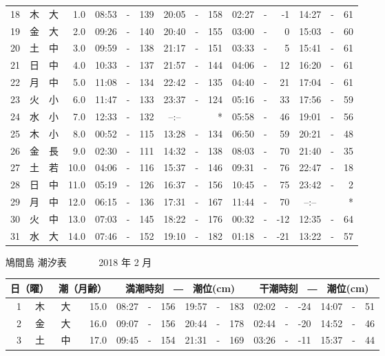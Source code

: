 \documentclass[12pt.a4j]{jsarticle}
\begin{document}
\begin{center}
\begin{table}[ht]
\begin{tabular}{|rc|cr|ccrccr|ccrccr|}
18 & 木 & 大 &  1.0 & 08:53 &-& 139 & 20:05 &-& 158 & 02:27 &-&  -1 & 14:27 &-&  61 \\
19 & 金 & 大 &  2.0 & 09:26 &-& 140 & 20:40 &-& 155 & 03:00 &-&   0 & 15:03 &-&  60 \\
20 & 土 & 中 &  3.0 & 09:59 &-& 138 & 21:17 &-& 151 & 03:33 &-&   5 & 15:41 &-&  61 \\
21 & 日 & 中 &  4.0 & 10:33 &-& 137 & 21:57 &-& 144 & 04:06 &-&  12 & 16:20 &-&  61 \\
22 & 月 & 中 &  5.0 & 11:08 &-& 134 & 22:42 &-& 135 & 04:40 &-&  21 & 17:04 &-&  61 \\
23 & 火 & 小 &  6.0 & 11:47 &-& 133 & 23:37 &-& 124 & 05:16 &-&  33 & 17:56 &-&  59 \\
24 & 水 & 小 &  7.0 & 12:33 &-& 132 & --:-- & &  *  & 05:58 &-&  46 & 19:01 &-&  56 \\
25 & 木 & 小 &  8.0 & 00:52 &-& 115 & 13:28 &-& 134 & 06:50 &-&  59 & 20:21 &-&  48 \\
26 & 金 & 長 &  9.0 & 02:30 &-& 111 & 14:32 &-& 138 & 08:03 &-&  70 & 21:40 &-&  35 \\
27 & 土 & 若 & 10.0 & 04:06 &-& 116 & 15:37 &-& 146 & 09:31 &-&  76 & 22:47 &-&  18 \\
28 & 日 & 中 & 11.0 & 05:19 &-& 126 & 16:37 &-& 156 & 10:45 &-&  75 & 23:42 &-&   2 \\
29 & 月 & 中 & 12.0 & 06:15 &-& 136 & 17:31 &-& 167 & 11:44 &-&  70 & --:-- & &  *  \\
30 & 火 & 中 & 13.0 & 07:03 &-& 145 & 18:22 &-& 176 & 00:32 &-& -12 & 12:35 &-&  64 \\
31 & 水 & 大 & 14.0 & 07:46 &-& 152 & 19:10 &-& 182 & 01:18 &-& -21 & 13:22 &-&  57 \\
\hline
\end{tabular}
\end{table}
\newpage
{\LARGE 鳩間島  潮汐表　　　}
{\large 2018 年  2 月}\\
\begin{table}[ht]
\begin{tabular}{|rc|cr|ccrccr|ccrccr|}
\hline
\multicolumn{2}{|c|}{日（曜）} & \multicolumn{2}{c|}{潮（月齢）} & \multicolumn{6}{c|}{満潮時刻　―　潮位(cm)} & \multicolumn{6}{c|}{干潮時刻　―　潮位(cm)} \\
\hline
 1 & 木 & 大 & 15.0 & 08:27 &-& 156 & 19:57 &-& 183 & 02:02 &-& -24 & 14:07 &-&  51 \\
 2 & 金 & 大 & 16.0 & 09:07 &-& 156 & 20:44 &-& 178 & 02:44 &-& -20 & 14:52 &-&  46 \\
 3 & 土 & 中 & 17.0 & 09:45 &-& 154 & 21:31 &-& 169 & 03:26 &-& -11 & 15:37 &-&  44 \\

\end{tabular}
\end{table}
\end{center}
\end{document}
